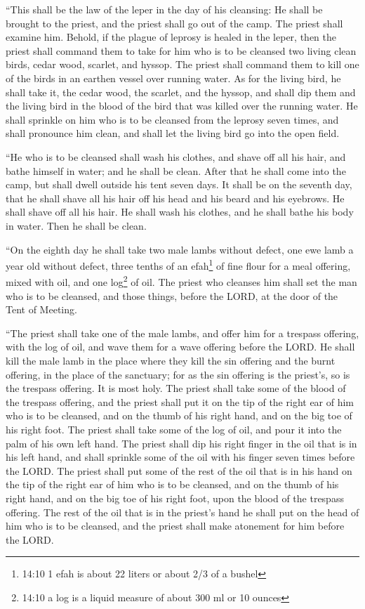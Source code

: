 \quad\myverse{}“This shall be the law of the leper in the day of his cleansing:
He shall be brought to the priest,
\myverse{}and the priest shall go out of the camp. The priest shall examine him. Behold,
if the plague of leprosy is healed in the leper,
\myverse{}then the priest shall command them to take for him who is to be cleansed two
living clean birds, cedar wood, scarlet, and hyssop.
\myverse{}The priest shall command them to kill one of the birds in an earthen vessel
over running water.
\myverse{}As for the living bird, he shall take it, the cedar wood, the scarlet, and
the hyssop, and shall dip them and the living bird in the blood of the bird that was killed over the running
water.
\myverse{}He shall sprinkle on him who is to be cleansed from the leprosy seven times,
and shall pronounce him clean, and shall let the living bird go into the open field.


\myverse{}“He who is to be cleansed shall wash his clothes, and shave off
all his hair, and bathe himself in water; and he shall be clean. After that he shall come into the camp,
but shall dwell outside his tent seven days.
\myverse{}It shall be on the seventh day, that he shall shave all his hair off his head
and his beard and his eyebrows. He shall shave off all his hair. He shall wash his clothes, and he shall
bathe his body in water. Then he shall be clean.


\myverse{}“On the eighth day he shall take two male lambs without defect,
one ewe lamb a year old without defect, three tenths of an efah\footnote{14:10 1 efah is about 22 liters or about 2/3 of a bushel} of fine flour for a meal offering,
mixed with oil, and one log\footnote{14:10 a log is a liquid measure of about 300 ml or 10 ounces} of oil.
\myverse{}The priest who cleanses him shall set the man who is to be cleansed, and
those things, before the LORD, at the door of the Tent of Meeting.


\myverse{}“The priest shall take one of the male lambs, and offer him
for a trespass offering, with the log of oil, and wave them for a wave offering before the LORD.
\myverse{}He shall kill the male lamb in the place where they kill the sin offering
and the burnt offering, in the place of the sanctuary; for as the sin offering is the priest’s, so is
the trespass offering. It is most holy.
\myverse{}The priest shall take some of the blood of the trespass offering, and the
priest shall put it on the tip of the right ear of him who is to be cleansed, and on the thumb of his
right hand, and on the big toe of his right foot.
\myverse{}The priest shall take some of the log of oil, and pour it into the palm of
his own left hand.
\myverse{}The priest shall dip his right finger in the oil that is in his left hand,
and shall sprinkle some of the oil with his finger seven times before the LORD.
\myverse{}The priest shall put some of the rest of the oil that is in his hand on the
tip of the right ear of him who is to be cleansed, and on the thumb of his right hand, and on the big
toe of his right foot, upon the blood of the trespass offering.
\myverse{}The rest of the oil that is in the priest’s hand he shall put on the head
of him who is to be cleansed, and the priest shall make atonement for him before the LORD.


